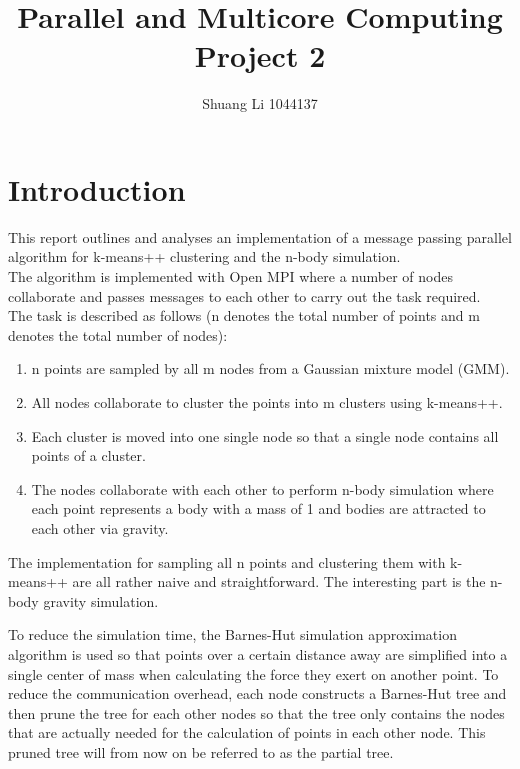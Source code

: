 \documentclass{article}
\title{Parallel and Multicore Computing Project 2}
\author{Shuang Li 1044137}
\date{}
\begin{document}
\maketitle

\section*{Introduction}
This report outlines and analyses an implementation of a message passing parallel algorithm for
k-means++ clustering and the n-body simulation.\\
The algorithm is implemented with Open MPI where a number of nodes collaborate and passes messages
to each other to carry out the task required.\\
The task is described as follows (n denotes the total number of points and m denotes the total
number of nodes):
\begin{enumerate}
	\item n points are sampled by all m nodes from a Gaussian mixture model (GMM).
	\item All nodes collaborate to cluster the points into m clusters using k-means++.
	\item Each cluster is moved into one single node so that a single node contains all points of a
		cluster.
	\item The nodes collaborate with each other to perform n-body simulation where each point
		represents a body with a mass of 1 and bodies are attracted to each other via gravity.
\end{enumerate}

The implementation for sampling all n points and clustering them with k-means++ are all rather
naive and straightforward. The interesting part is the n-body gravity simulation.

To reduce the simulation time, the Barnes-Hut simulation approximation algorithm is used so that
points over a certain distance away are simplified into a single center of mass when calculating the
force they exert on another point. To reduce the communication overhead, each node constructs a
Barnes-Hut tree and then prune the tree for each other nodes so that the tree only contains the
nodes that are actually needed for the calculation of points in each other node. This pruned tree
will from now on be referred to as the partial tree.
\end{document}
